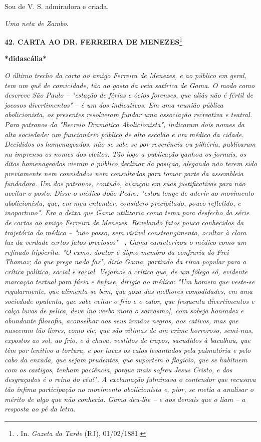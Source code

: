 Sou de V. S. admiradora e criada.

\emph{Uma neta de Zambo}.

\textbf{42. CARTA AO DR. FERREIRA DE MENEZES}\footnote{. In.
  \emph{Gazeta da Tarde} (RJ), 01/02/1881.}

\textbf{*didascália*}

\emph{O último trecho da carta ao amigo Ferreira de Menezes, e ao
público em geral, tem um quê de comicidade, tão ao gosto da veia
satírica de Gama. O modo como descreve São Paulo -- "estação de férias e
ócios forenses, que aliás não é fértil de jocosos divertimentos" -- é um
dos indicativos. Em uma reunião pública abolicionista, os presentes
resolveram fundar uma associação recreativa e teatral. Para patronos do
"Recreio Dramático Abolicionista", indicaram dois nomes da alta
sociedade: um funcionário público de alto escalão e um médico da cidade.
Decididos os homenageados, não se sabe se por reverência ou pilhéria,
publicaram na imprensa os nomes dos eleitos. Tão logo a publicação
ganhou os jornais, os ditos homenageados vieram a público declinar da
posição, alegando não terem sido previamente nem convidados nem
consultados para tomar parte da assembleia fundadora. Um dos patronos,
contudo, avançou em suas justificativas para não aceitar o posto. Disse
o médico João Pedro: "estou longe de aderir ao movimento abolicionista,
que, em meu entender, considero precipitado, pouco refletido, e
inoportuno". Era a deixa que Gama utilizaria como tema para desfecho da
série de cartas ao amigo Ferreira de Menezes. Revelando fatos pouco
conhecidos da trajetória do médico -- "não posso, sem visível
constrangimento, ocultar à clara luz da verdade certos fatos preciosos"
--, Gama caracterizou o médico como um refinado hipócrita. "O exmo.
doutor é digno membro da confraria do Frei Thomaz; do que prega nada
faz", dizia Gama, partindo da rima popular para a crítica política,
social e racial. Vejamos a crítica que, de um fôlego só, evidente
marcação textual para fúria e ênfase, dirigia ao médico: "Um homem que
veste-se regularmente, que alimenta-se bem, que goza das melhores
comodidades, em uma sociedade opulenta, que sabe evitar o frio e o
calor, que frequenta divertimentos e calça luvas de pelica, deve {[}no
verbo mora o sarcasmo{]}, com sobeja honradez e abundante filosofia,
aconselhar aos seus irmãos negros, aos cativos, mas que nasceram tão
livres, como ele, que são vítimas de um crime horroroso, semi-nus,
expostos ao sol, ao frio, e à chuva, vestidos de trapos, sacudidos à
bacalhau, que têm por lenitivo a tortura, e por luvas os calos
levantados pela palmatória e pelo cabo da enxada, que sejam prudentes,
que suportem o flagício, que se habituem com os castigos, tenham
paciência, porque mais sofreu Jesus Cristo, e dos desgraçados é o reino
do céu!". A exclamação fulminava o contendor que recusava tão ínfima
participação no movimento abolicionista e, pior, se metia a analisar o
mérito de algo que não conhecia. Gama deu-lhe -- e aos demais que o liam
-- a resposta ao pé da letra.}

